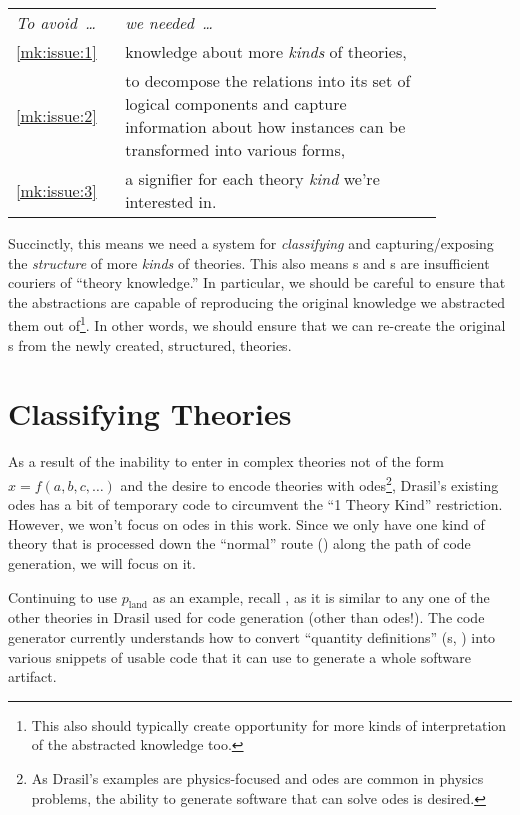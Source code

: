 \begin{longtable}[c]{>{\raggedright}p{0.2\linewidth}>{\raggedright\arraybackslash}p{0.65\linewidth}}
    \textit{To avoid~\ldots{}} & \textit{we needed~\ldots{}}                                    \\
    \ref{mk:issue:1}           & knowledge about more \textit{kinds} of theories,               \\
    \ref{mk:issue:2}           & to decompose the relations into its set of
    logical components and capture information about how instances can be
    transformed into various forms,                                                             \\
    \ref{mk:issue:3}           & a signifier for each theory \textit{kind} we're interested in. \\
\end{longtable}

Succinctly, this means we need a system for \textit{classifying} and
capturing/exposing the \textit{structure} of more \textit{kinds} of theories.
This also means \RelationConcept{}s and \Relation{}s are insufficient couriers
of ``theory knowledge.'' In particular, we should be careful to ensure that the
abstractions are capable of reproducing the original knowledge we abstracted
them out of\footnote{This also should typically create opportunity for more
kinds of interpretation of the abstracted knowledge too.}. In other words, we
should ensure that we can re-create the original \RelationConcept{}s from the
newly created, structured, theories.

\section{Classifying Theories}
\label{chap:modelkinds:sec:classifying-theories}

As a result of the inability to enter in complex theories not of the form \(x =
f(a, b, c, \ldots{})\) and the desire to encode theories with
\acsp{ode}\footnote{As Drasil's examples are physics-focused and \acsp{ode} are
    common in physics problems, the ability to generate software that can solve
    \acsp{ode} is desired.}, Drasil's existing \acsp{ode} has a bit of temporary code
to circumvent the ``1 Theory Kind'' restriction. However, we won't focus on
\acsp{ode} in this work. Since we only have one kind of theory that is processed
down the ``normal'' route (\relToQD{}) along the path of code generation, we
will focus on it.

Continuing to use \(p_\text{land}\) as an example, recall
, as it is similar to any one of the other
theories in Drasil used for code generation (other than \acsp{ode}!). The code
generator currently understands how to convert ``quantity definitions''
(\QDefinition{}s, ) into various snippets of
usable code that it can use to generate a whole software artifact.

